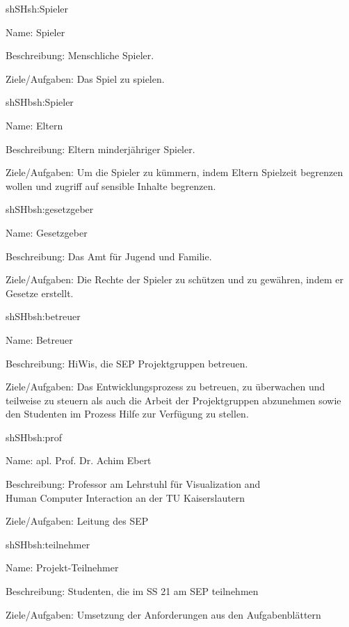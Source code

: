 \begin{description}[leftmargin=5em, style=sameline]
	
	\begin{lhp}{sh}{SH}{sh:Spieler}
		\item [Name:] Spieler
		\item [Beschreibung:] Menschliche Spieler.
		\item [Ziele/Aufgaben:] Das Spiel zu spielen.
	\end{lhp}
	
	\begin{lhp}{sh}{SH}{bsh:Spieler}
		\item [Name:] Eltern
		\item [Beschreibung:] Eltern minderjähriger Spieler.
		\item [Ziele/Aufgaben:] Um die Spieler zu kümmern, indem Eltern Spielzeit begrenzen wollen und zugriff auf sensible Inhalte begrenzen.
	\end{lhp}
	
	\begin{lhp}{sh}{SH}{bsh:gesetzgeber}
		\item [Name:] Gesetzgeber
		\item [Beschreibung:] Das Amt für Jugend und Familie.
		\item [Ziele/Aufgaben:] Die Rechte der Spieler zu schützen und zu gewähren, indem er Gesetze erstellt.
	\end{lhp}
	
	\begin{lhp}{sh}{SH}{bsh:betreuer}
		\item [Name:] Betreuer
		\item [Beschreibung:] HiWis, die SEP Projektgruppen betreuen.
		\item [Ziele/Aufgaben:] Das Entwicklungsprozess zu betreuen, zu überwachen und teilweise zu steuern als auch die Arbeit der Projektgruppen abzunehmen sowie den Studenten im Prozess Hilfe zur Verfügung zu stellen. 
	\end{lhp}
	
	\begin{lhp}{sh}{SH}{bsh:prof}
		\item [Name:] apl. Prof. Dr. Achim Ebert
		\item [Beschreibung:] Professor am Lehrstuhl für Visualization and\\ 
		Human Computer Interaction an der TU Kaiserslautern
		\item [Ziele/Aufgaben:]  Leitung des SEP
	\end{lhp}
	
	\begin{lhp}{sh}{SH}{bsh:teilnehmer}
		\item [Name:] Projekt-Teilnehmer
		\item [Beschreibung:] Studenten, die im SS 21 am SEP teilnehmen
		\item [Ziele/Aufgaben:]  Umsetzung der Anforderungen aus den Aufgabenblättern
	\end{lhp}
		
\end{description}

